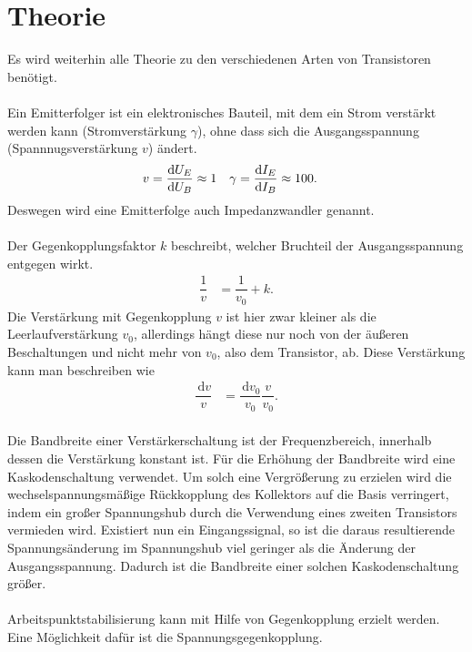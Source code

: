 \documentclass[a4paper,10pt]{article}
\newcommand{\td}{\,\text{d}}
\numberwithin{equation}{section}
\begin{document}
\section{Theorie}
Es wird weiterhin alle Theorie zu den verschiedenen Arten von Transistoren benötigt.
\\\\ Ein Emitterfolger ist ein elektronisches Bauteil, mit dem ein Strom verstärkt werden kann (Stromverstärkung $\gamma $), ohne dass sich die Ausgangsspannung (Spannnugsverstärkung $v$) ändert.
\begin{align} 
        v &= \diff[]{U_E}{U_B}\approx 1 & \gamma &= \diff[]{I_E}{I_B}\approx 100
.\end{align} 
Deswegen wird eine Emitterfolge auch Impedanzwandler genannt.
\\\\ Der Gegenkopplungsfaktor $k$ beschreibt, welcher Bruchteil der Ausgangsspannung entgegen wirkt.
\begin{align} 
        \dfrac{1}{v} &= \dfrac{1}{v_0}+k
.\end{align} 
Die Verstärkung mit Gegenkopplung $v$ ist hier zwar kleiner als die Leerlaufverstärkung $v_0$, allerdings hängt diese nur noch von der äußeren Beschaltungen und nicht mehr von $v_0$, also dem Transistor, ab.
Diese Verstärkung kann man beschreiben wie
\begin{align} 
        \dfrac{\td v}{v} &= \dfrac{\td v_0}{v_0}\dfrac{v}{v_0}
.\end{align} 
\\Die Bandbreite einer Verstärkerschaltung ist der Frequenzbereich, innerhalb dessen die Verstärkung konstant ist.
Für die Erhöhung der Bandbreite wird eine Kaskodenschaltung verwendet.
Um solch eine Vergrößerung zu erzielen wird die wechselspannungsmäßige Rückkopplung des Kollektors auf die Basis verringert, indem ein großer Spannungshub durch die Verwendung eines zweiten Transistors vermieden wird.
Existiert nun ein Eingangssignal, so ist die daraus resultierende Spannungsänderung im Spannungshub viel geringer als die Änderung der Ausgangsspannung.
Dadurch ist die Bandbreite einer solchen Kaskodenschaltung größer.
\\\\Arbeitspunktstabilisierung kann mit Hilfe von Gegenkopplung erzielt werden.
Eine Möglichkeit dafür ist die Spannungsgegenkopplung.
\end{document}
